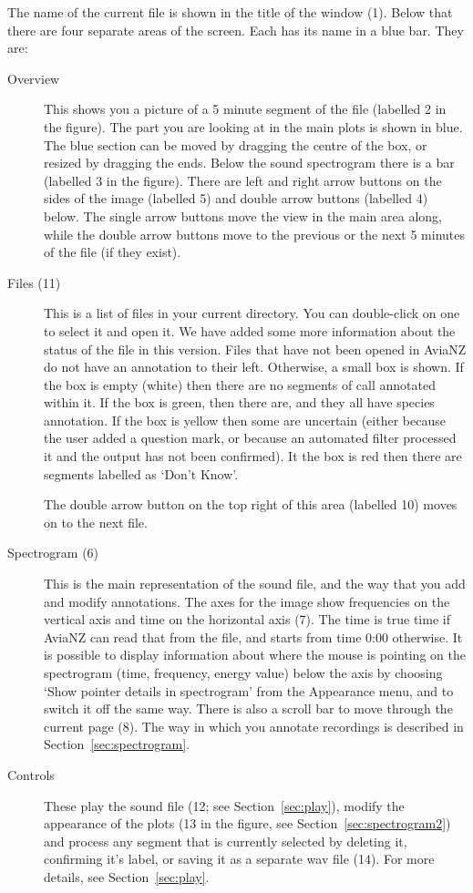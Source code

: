 \documentclass{article}
\begin{document}
The name of the current file is shown in the title of the window (1). Below that there are four separate areas of the screen. Each has its name in a blue bar. They are:
	\begin{description}
	\item[Overview] This shows you a picture of a 5 minute segment of the file (labelled 2 in the figure). The part you are looking at in the main plots is shown in blue. The blue section can be moved by dragging the centre of the box, or resized by dragging the ends. Below the sound spectrogram there is a bar (labelled 3 in the figure). There are left and right arrow buttons on the sides of the image (labelled 5) and double arrow buttons (labelled 4) below. The single arrow buttons move the view in the main area along, while the double arrow buttons move to the previous or the next 5 minutes of the file (if they exist). 
	\item [Files (11)] This is a list of files in your current directory. You can double-click on one to select it and open it. We have added some more information about the status of the file in this version. Files that have not been opened in AviaNZ do not have an annotation to their left. Otherwise, a small box is shown. If the box is empty (white) then there are no segments of call annotated within it. If the box is green, then there are, and they all have species annotation. If the box is yellow then some are uncertain (either because the user added a question mark, or because an automated filter processed it and the output has not been confirmed). It the box is red then there are segments labelled as `Don't Know'. 

The double arrow button on the top right of this area (labelled 10) moves on to the next file.
	\item[Spectrogram (6)] This is the main representation of the sound file, and the way that you add and modify annotations. The axes for the image show frequencies on the vertical axis and time on the horizontal axis (7). The time is true time if AviaNZ can read that from the file, and starts from time 0:00 otherwise. It is possible to display information about where the mouse is pointing on the spectrogram (time, frequency, energy value) below the axis by choosing `Show pointer details in spectrogram' from the Appearance menu, and to switch it off the same way. There is also a scroll bar to move through the current page (8).
The way in which you annotate recordings is described in Section~\ref{sec:spectrogram}.
	\item[Controls] These play the sound file (12; see Section~\ref{sec:play}), modify the appearance of the plots (13 in the figure, see Section~\ref{sec:spectrogram2}) and process any segment that is currently selected by deleting it, confirming it's label, or saving it as a separate wav file (14).  For more details, see  Section~\ref{sec:play}.
	\end{description}
\end{document}
